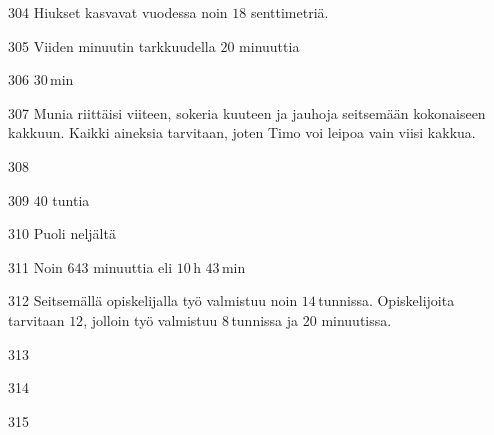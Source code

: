 \begin{Vastaus}{304}
Hiukset kasvavat vuodessa noin $18$ senttimetriä.
	
\end{Vastaus}
\begin{Vastaus}{305}
Viiden minuutin tarkkuudella $20$ minuuttia
	
\end{Vastaus}
\begin{Vastaus}{306}
        $30$\,min
    
\end{Vastaus}
\begin{Vastaus}{307}
Munia riittäisi viiteen, sokeria kuuteen ja jauhoja seitsemään kokonaiseen kakkuun. Kaikki aineksia tarvitaan, joten Timo voi leipoa vain viisi kakkua.
	
\end{Vastaus}
\begin{Vastaus}{308}
	
\end{Vastaus}
\begin{Vastaus}{309}
		$40$ tuntia
	
\end{Vastaus}
\begin{Vastaus}{310}
Puoli neljältä
	
\end{Vastaus}
\begin{Vastaus}{311}
        Noin $643$ minuuttia eli $10$\,h $43$\,min
    
\end{Vastaus}
\begin{Vastaus}{312}
Seitsemällä opiskelijalla työ valmistuu noin $14$\,tunnissa. Opiskelijoita tarvitaan $12$, jolloin työ valmistuu $8$\,tunnissa ja $20$ minuutissa.
	
\end{Vastaus}
\begin{Vastaus}{313}
	
\end{Vastaus}
\begin{Vastaus}{314}
	
\end{Vastaus}
\begin{Vastaus}{315}
	
\end{Vastaus}
